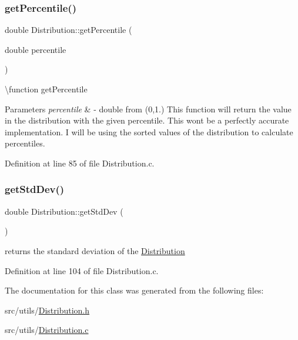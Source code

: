 \subsubsection{\texorpdfstring{getPercentile()}{getPercentile()}}
{\footnotesize\ttfamily double Distribution\+::get\+Percentile (\begin{DoxyParamCaption}\item[{double}]{percentile }\end{DoxyParamCaption})}

\textbackslash{}function get\+Percentile 
\begin{DoxyParams}{Parameters}
{\em percentile} & -\/ double from (0,1.) This function will return the value in the distribution with the given percentile. This won\textquotesingle{}t be a perfectly accurate implementation. I will be using the sorted values of the distribution to calculate percentiles. \\
\hline
\end{DoxyParams}


Definition at line 85 of file Distribution.\+c.

\mbox{\label{class_world_architect_1_1_distribution_a835105360b0c7da1a0eec0943963f0d7}} 
\subsubsection{\texorpdfstring{getStdDev()}{getStdDev()}}
{\footnotesize\ttfamily double Distribution\+::get\+Std\+Dev (\begin{DoxyParamCaption}{ }\end{DoxyParamCaption})}



returns the standard deviation of the \mbox{\hyperlink{class_world_architect_1_1_distribution}{Distribution}} 



Definition at line 104 of file Distribution.\+c.



The documentation for this class was generated from the following files\+:\begin{DoxyCompactItemize}
\item 
src/utils/\mbox{\hyperlink{_distribution_8h}{Distribution.\+h}}\item 
src/utils/\mbox{\hyperlink{_distribution_8c}{Distribution.\+c}}\end{DoxyCompactItemize}
